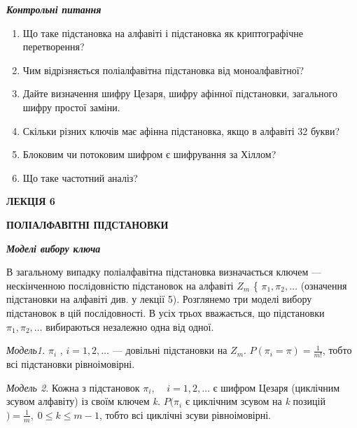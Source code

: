 \bigskip


\bigskip


\bigskip

{\centering\bfseries\itshape
Контрольні питання
\par}


\bigskip

\liststyleWWviiiNumxiv
\begin{enumerate}
\item Що таке підстановка на алфавіті і підстановка як криптографічне
перетворення?
\item Чим відрізняється поліалфавітна підстановка від моноалфавітної?
\item Дайте визначення шифру Цезаря, шифру афінної підстановки, загального шифру
простої заміни.
\item Скільки різних ключів має афінна підстановка, якщо в алфавіті 32 букви?
\item Блоковим чи потоковим шифром є шифрування за Хіллом?
\item Що таке частотний аналіз?
\end{enumerate}

\bigskip


\bigskip


\bigskip

{\bfseries
ЛЕКЦІЯ  6}


\bigskip

{\centering\bfseries
ПОЛІАЛФАВІТНІ  ПІДСТАНОВКИ
\par}


\bigskip


\bigskip

{\centering\bfseries\itshape
Моделі вибору ключа
\par}


\bigskip


\bigskip

В загальному випадку поліалфавітна підстановка визначається ключем ---
нескінченною послідовністю підстановок на алфавіті  ${Z_{{m}}}$ \{ ${\pi
_{{1}},\pi _{{2}},\dots}$ (означення підстановки на алфавіті
див. у лекції 5). Розглянемо три моделі вибору підстановок в цій послідовності.
В усіх трьох вважається, що підстановки  ${\pi _{{1}},\pi
_{{2}},\dots}$ вибираються незалежно одна від одної.

\textit{Модель1.  } ${\pi _{{i}}}$ ,  ${i=1,2,\dots}$ ---
довільні підстановки на  ${Z_{{m}}}$.  ${P(\pi _{{i}}=\pi )=\frac{1}{m!}}$,
тобто всі підстановки рівноімовірні.

 \textit{Модель 2.  } Кожна з підстановок  ${\pi
_{{i}},\;\;\;\;i=1,2,\dots}$ є шифром Цезаря (циклічним
зсувом алфавіту) із своїм ключем \textit{k}\textit{.}   ${P(\pi _{{i}}}$ є
циклічним зсувом на \textit{k} позицій ${)=\frac{1}{m},\;0\le k\le m-1}$, тобто
всі циклічні зсуви  рівноімовірні. $ $


